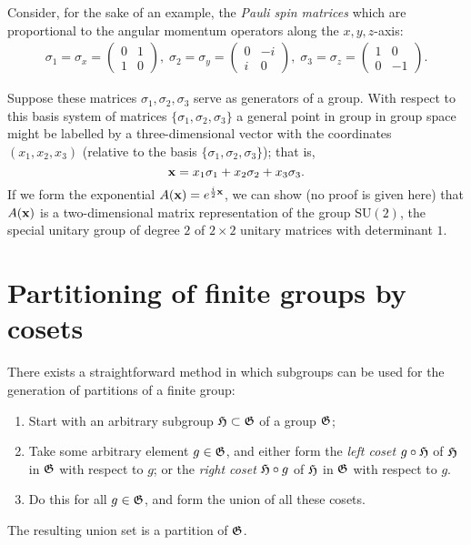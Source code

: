 {\color{blue}
\bexample
Consider, for the sake of an example, the
{\em Pauli spin matrices}
which are proportional to the angular momentum operators along the $x,y,z$-axis:\cite{schiff-55}
\begin{equation}
\begin{split}
\sigma_1=\sigma_x
=
\begin{pmatrix}
0&1\\
1&0
\end{pmatrix}
,
\;
\sigma_2=\sigma_y
=
\begin{pmatrix}
0&-i\\
i&0
\end{pmatrix}
,
\;
\sigma_3=\sigma_z
=
\begin{pmatrix}
1&0\\
0&-1
\end{pmatrix}
.
\end{split}
\end{equation}

Suppose these matrices $\sigma_1,\sigma_2,\sigma_3$
serve as generators of a group.
With respect to this basis system of matrices $\{ \sigma_1,\sigma_2,\sigma_3\}$
a general point in group in group space might be labelled by a three-dimensional
vector with the coordinates $(x_1,x_2,x_3)$
(relative to the basis $\{ \sigma_1,\sigma_2,\sigma_3\}$);
that is,
\begin{equation}
{\bf x} =   x_1\sigma_1 + x_2\sigma_2 +x_3 \sigma_3.
\end{equation}
If we form the exponential $  A  ({\bf x})= e^{\frac{i}{2} {\bf x}}$,
we can show (no proof is given here)
that $  A  ({\bf x})$ is a two-dimensional matrix representation of the group $\textrm{SU}(2)$,
the special unitary group of degree $2$ of $2\times 2$ unitary matrices with determinant $1$.
\eexample
}

\section{Partitioning of finite groups by cosets}

There exists a straightforward method in which subgroups can be used for the generation of partitions of
a  finite  group:
\begin{enumerate}
\item
Start with an arbitrary subgroup ${\frak H} \subset {\frak G}$ of a group ${\frak G}$;
\item
Take some arbitrary element $g \in {\frak G}$, and either form the
{\em left coset} $g \circ {\frak H}$
of ${\frak H}$ in ${\frak G}$ with respect to $g$;
or the
{\em right coset} $ {\frak H} \circ g$
of ${\frak H}$ in ${\frak G}$ with respect to $g$.
\item
Do this for all $g \in {\frak G}$, and form the union of all these cosets.
\end{enumerate}
The resulting union set is a partition of ${\frak G}$.

